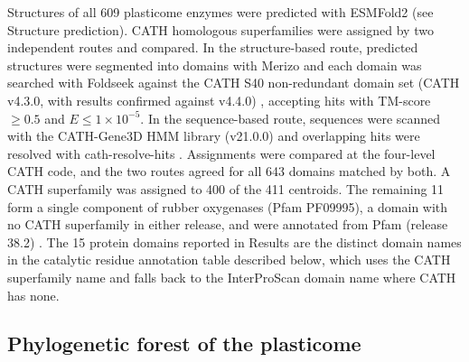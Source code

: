 \documentclass[pdflatex,sn-nature,iicol]{sn-jnl}%
\begin{document}
Structures of all 609 plasticome enzymes were predicted with ESMFold2 (see Structure prediction). CATH homologous superfamilies were assigned by two independent routes and compared. In the structure-based route, predicted structures were segmented into domains with Merizo \citep{lau2023merizo} and each domain was searched with Foldseek \citep{vankempen2024foldseek} against the CATH S40 non-redundant domain set (CATH v4.3.0, with results confirmed against v4.4.0) \citep{sillitoe2021cath,waman2024cath}, accepting hits with TM-score $\ge 0.5$ and $E \le 1\times10^{-5}$. In the sequence-based route, sequences were scanned with the CATH-Gene3D HMM library (v21.0.0) and overlapping hits were resolved with cath-resolve-hits \citep{lewis2018gene3d,lewis2019crh}. Assignments were compared at the four-level CATH code, and the two routes agreed for all 643 domains matched by both. A CATH superfamily was assigned to 400 of the 411 centroids. The remaining 11 form a single component of rubber oxygenases (Pfam PF09995), a domain with no CATH superfamily in either release, and were annotated from Pfam (release 38.2) \citep{paysanlafosse2025pfam}. The 15 protein domains reported in Results are the distinct domain names in the catalytic residue annotation table described below, which uses the CATH superfamily name and falls back to the InterProScan \citep{jones2014interproscan} domain name where CATH has none. %

\subsection{Phylogenetic forest of the plasticome}
\end{document}
